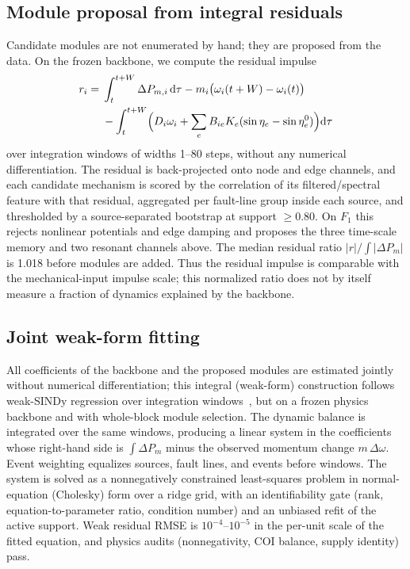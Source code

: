 \documentclass[journal]{IEEEtran}
\begin{document}
\subsection{Module proposal from integral residuals}
\label{sec:proposal}
Candidate modules are not enumerated by hand; they are proposed from the data.
On the frozen backbone, we compute the residual impulse
\begin{equation}
\begin{aligned}
r_i ={}& \int_t^{t+W}\Delta P_{m,i}\,\mathrm d\tau
- m_i\bigl(\omega_i(t+W)-\omega_i(t)\bigr)\\
&{}-\int_t^{t+W}\Bigl(D_i\omega_i
+\sum_e B_{ie}K_e(\sin\eta_e-\sin\eta_e^0)\Bigr)\mathrm d\tau
\end{aligned}
\label{eq:resimpulse}
\end{equation}
over integration windows of widths 1--80 steps, without any numerical
differentiation. The residual is back-projected onto node and edge channels, and
each candidate mechanism is scored by the correlation of its filtered/spectral
feature with that residual, aggregated per fault-line group inside each source,
and thresholded by a source-separated bootstrap at support $\geq 0.80$. On $F_1$
this rejects nonlinear potentials and edge damping and proposes the three
time-scale memory and two resonant channels above. The median residual ratio
$|r|/\int|\Delta P_m|$ is 1.018 before modules are added. Thus the residual
impulse is comparable with the mechanical-input impulse scale; this normalized
ratio does not by itself measure a fraction of dynamics explained by the
backbone.

\subsection{Joint weak-form fitting}
\label{sec:fit}
All coefficients of the backbone and the proposed modules are estimated jointly
without numerical differentiation; this integral (weak-form) construction
follows weak-SINDy regression over integration windows~\cite{messenger2021wsindy},
but on a frozen physics backbone and with whole-block module selection. The
dynamic balance is integrated over the
same windows, producing a linear system in the coefficients whose right-hand
side is $\int\Delta P_{m}$ minus the observed momentum change $m\,\Delta\omega$.
Event weighting equalizes sources, fault lines, and events before windows. The
system is solved as a nonnegatively constrained least-squares problem in
normal-equation (Cholesky) form over a ridge grid, with an identifiability gate
(rank, equation-to-parameter ratio, condition number) and an unbiased refit of
the active support. Weak residual RMSE is $10^{-4}$--$10^{-5}$ in the per-unit
scale of the fitted equation, and physics audits (nonnegativity, COI balance,
supply identity) pass.
\end{document}
